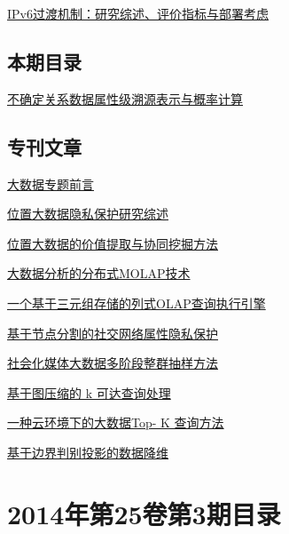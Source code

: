 \documentclass[a4paper]{article}
\begin{document}
\href{http://www.jos.org.cn/ch/reader/download_pdf.aspx?file_no=4557&year_id=2014&quarter_id=4&falg=1}{IPv6过渡机制：研究综述、评价指标与部署考虑}

\subsection{本期目录}
\href{http://www.jos.org.cn/ch/reader/download_pdf.aspx?file_no=4426&year_id=2014&quarter_id=4&falg=1}{不确定关系数据属性级溯源表示与概率计算}

\subsection{专刊文章}
\href{http://www.jos.org.cn/ch/reader/download_pdf.aspx?file_no=4572&year_id=2014&quarter_id=4&falg=1}{大数据专题前言}

\href{http://www.jos.org.cn/ch/reader/download_pdf.aspx?file_no=4551&year_id=2014&quarter_id=4&falg=1}{位置大数据隐私保护研究综述}

\href{http://www.jos.org.cn/ch/reader/download_pdf.aspx?file_no=4570&year_id=2014&quarter_id=4&falg=1}{位置大数据的价值提取与协同挖掘方法}

\href{http://www.jos.org.cn/ch/reader/download_pdf.aspx?file_no=4569&year_id=2014&quarter_id=4&falg=1}{大数据分析的分布式MOLAP技术}

\href{http://www.jos.org.cn/ch/reader/download_pdf.aspx?file_no=4568&year_id=2014&quarter_id=4&falg=1}{一个基于三元组存储的列式OLAP查询执行引擎}

\href{http://www.jos.org.cn/ch/reader/download_pdf.aspx?file_no=4565&year_id=2014&quarter_id=4&falg=1}{基于节点分割的社交网络属性隐私保护}

\href{http://www.jos.org.cn/ch/reader/download_pdf.aspx?file_no=4566&year_id=2014&quarter_id=4&falg=1}{社会化媒体大数据多阶段整群抽样方法}

\href{http://www.jos.org.cn/ch/reader/download_pdf.aspx?file_no=4567&year_id=2014&quarter_id=4&falg=1}{基于图压缩的 k 可达查询处理}

\href{http://www.jos.org.cn/ch/reader/download_pdf.aspx?file_no=4564&year_id=2014&quarter_id=4&falg=1}{一种云环境下的大数据Top- K 查询方法}

\href{http://www.jos.org.cn/ch/reader/download_pdf.aspx?file_no=4571&year_id=2014&quarter_id=4&falg=1}{基于边界判别投影的数据降维}


\section{\textbf{2014年第25卷第3期目录}}
\end{document}
